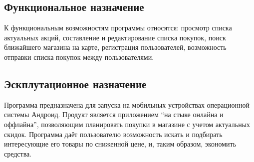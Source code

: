 \subsection{Функциональное назначение}
К функциональным возможностям программы относятся: просмотр списка
актуальных акций, составление и редактирование списка покупок, поиск
ближайшего магазина на карте, регистрация пользователей, возможность
отправки списка покупок между пользователями.

\subsection{Эскплутационное назначение}
Программа предназначена для запуска на мобильных устройствах операционной
системы Андроид. Продукт является приложением ``на стыке онлайна и оффлайна'',
позволяющим планировать покупки в магазине с учетом актуальных скидок.
Программа даёт пользователю возможность искать и подбирать
интересующие его товары по сниженной цене, и, таким образом, экономить
средства. 




